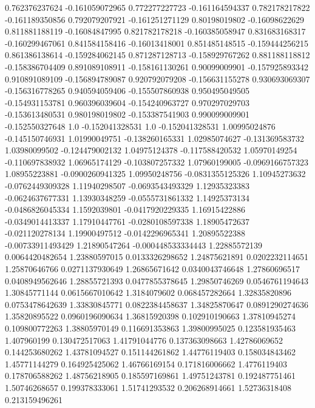  0.762376237624  -0.161059072965
 0.772277227723  -0.161164594337
 0.782178217822  -0.161189350856
 0.792079207921  -0.161251271129
  0.80198019802   -0.16098622629
 0.811881188119   -0.16084847995
 0.821782178218  -0.160385058947
 0.831683168317  -0.160299467061
 0.841584158416   -0.16013418001
 0.851485148515  -0.159444256215
 0.861386138614  -0.159284062145
 0.871287128713  -0.158929767262
 0.881188118812  -0.158386704409
 0.891089108911  -0.158161130261
  0.90099009901  -0.157925893342
 0.910891089109  -0.156894789087
 0.920792079208  -0.156631155278
 0.930693069307  -0.156316778265
 0.940594059406  -0.155507860938
 0.950495049505  -0.154931153781
 0.960396039604  -0.154240963727
 0.970297029703  -0.153613480531
 0.980198019802  -0.153387541903
 0.990099009901  -0.152550327648
            1.0  -0.152041328531
            1.0  -0.152041328531
  1.00995024876  -0.145150746931
  1.01990049751  -0.138260165331
  1.02985074627  -0.131369583732
  1.03980099502  -0.124479002132
  1.04975124378  -0.117588420532
  1.05970149254  -0.110697838932
  1.06965174129  -0.103807257332
  1.07960199005  -0.0969166757323
  1.08955223881  -0.0900260941325
  1.09950248756  -0.0831355125326
  1.10945273632  -0.0762449309328
  1.11940298507  -0.0693543493329
  1.12935323383  -0.0624637677331
  1.13930348259  -0.0555731861332
  1.14925373134  -0.0486826045334
   1.1592039801  -0.0417920229335
  1.16915422886  -0.0349014413337
  1.17910447761  -0.0280108597338
  1.18905472637  -0.021120278134
  1.19900497512  -0.0142296965341
  1.20895522388  -0.00733911493429
  1.21890547264  -0.000448533334443
  1.22885572139  0.0064420482654
  1.23880597015  0.0133326298652
  1.24875621891  0.0202232114651
  1.25870646766  0.0271137930649
  1.26865671642  0.0340043746648
  1.27860696517  0.0408949562646
  1.28855721393  0.0477855378645
  1.29850746269  0.0546761194643
  1.30845771144  0.0615667010642
   1.3184079602   0.068457282664
  1.32835820896  0.0753478642639
  1.33830845771  0.0822384458637
  1.34825870647  0.0891290274636
  1.35820895522  0.0960196090634
  1.36815920398   0.102910190663
  1.37810945274   0.109800772263
  1.38805970149   0.116691353863
  1.39800995025   0.123581935463
    1.407960199   0.130472517063
  1.41791044776   0.137363098663
  1.42786069652   0.144253680262
  1.43781094527   0.151144261862
  1.44776119403   0.158034843462
  1.45771144279   0.164925425062
  1.46766169154   0.171816006662
   1.4776119403   0.178706588262
  1.48756218905   0.185597169861
  1.49751243781   0.192487751461
  1.50746268657   0.199378333061
  1.51741293532   0.206268914661
  1.52736318408   0.213159496261
